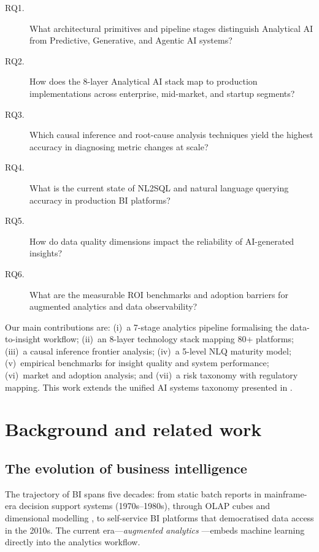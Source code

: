 \documentclass[preprint,12pt,authoryear]{elsarticle}
\theoremstyle{definition}
\begin{document}
\begin{description}
    \item[RQ1.] What architectural primitives and pipeline stages distinguish Analytical AI from Predictive, Generative, and Agentic AI systems?
    \item[RQ2.] How does the 8-layer Analytical AI stack map to production implementations across enterprise, mid-market, and startup segments?
    \item[RQ3.] Which causal inference and root-cause analysis techniques yield the highest accuracy in diagnosing metric changes at scale?
    \item[RQ4.] What is the current state of NL2SQL and natural language querying accuracy in production BI platforms?
    \item[RQ5.] How do data quality dimensions impact the reliability of AI-generated insights?
    \item[RQ6.] What are the measurable ROI benchmarks and adoption barriers for augmented analytics and data observability?
\end{description}

Our main contributions are: (i)~a 7-stage analytics pipeline formalising the data-to-insight workflow; (ii)~an 8-layer technology stack mapping 80+ platforms; (iii)~a causal inference frontier analysis; (iv)~a 5-level NLQ maturity model; (v)~empirical benchmarks for insight quality and system performance; (vi)~market and adoption analysis; and (vii)~a risk taxonomy with regulatory mapping. This work extends the unified AI systems taxonomy presented in \citet{mahdi2026taxonomy}.

\section{Background and related work}\label{sec:background}

\subsection{The evolution of business intelligence}

The trajectory of BI spans five decades: from static batch reports in mainframe-era decision support systems (1970s--1980s), through OLAP cubes and dimensional modelling \citep{kimball2013data}, to self-service BI platforms that democratised data access in the 2010s. The current era---\emph{augmented analytics} \citep{gartner2024augmented}---embeds machine learning directly into the analytics workflow.
\end{document}
